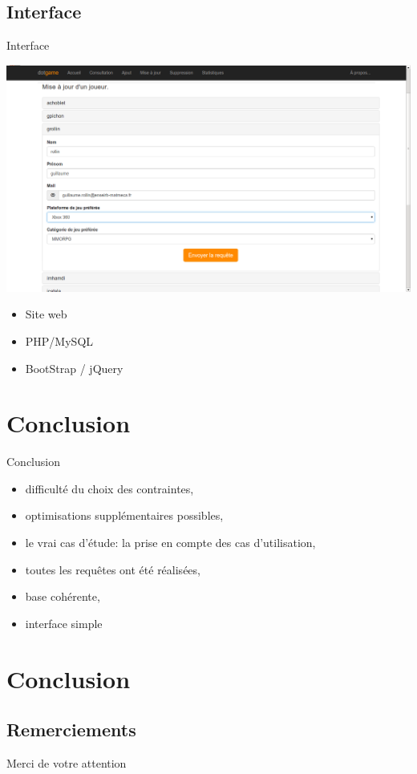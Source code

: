\documentclass{beamer}
\begin{document}
\subsection{Interface}
\begin{frame}
\begin{block}{Interface}
\begin{center}
\includegraphics[scale=0.20]{capture2.png}
\end{center}
\begin{itemize}
\item Site web
\item PHP/MySQL
\item BootStrap / jQuery
\end{itemize}
\end{block}
\end{frame}

\section*{Conclusion}
\begin{frame}
\begin{block}{Conclusion}
\begin{itemize}

\item{difficulté du choix des contraintes,}
\item{optimisations supplémentaires possibles,}
\item{le vrai cas d'étude: la prise en compte des cas d'utilisation,}

\item{toutes les requêtes ont été réalisées,}
\item{base cohérente,}
\item{interface simple}

\end{itemize}
\end{block}
\end{frame}


\section{Conclusion}
\subsection{Remerciements}
\begin{frame}
  \begin{center}
    \large{Merci de votre attention}
  \end{center}
  \end{frame}
\end{document}
